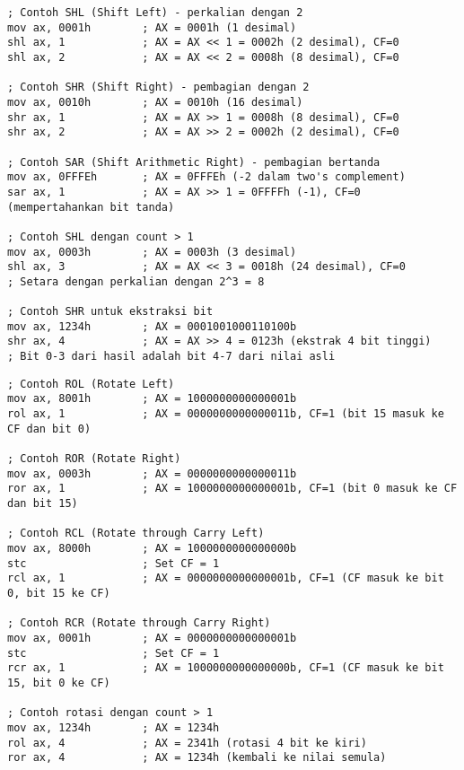 \documentclass[../main.tex]{subfiles}
\begin{document}
\begin{lstlisting}[language={[x86masm]Assembler}, caption=Instruksi SHIFT, label={lst:shift-examples}]
; Contoh SHL (Shift Left) - perkalian dengan 2
mov ax, 0001h        ; AX = 0001h (1 desimal)
shl ax, 1            ; AX = AX << 1 = 0002h (2 desimal), CF=0
shl ax, 2            ; AX = AX << 2 = 0008h (8 desimal), CF=0

; Contoh SHR (Shift Right) - pembagian dengan 2
mov ax, 0010h        ; AX = 0010h (16 desimal)
shr ax, 1            ; AX = AX >> 1 = 0008h (8 desimal), CF=0
shr ax, 2            ; AX = AX >> 2 = 0002h (2 desimal), CF=0

; Contoh SAR (Shift Arithmetic Right) - pembagian bertanda
mov ax, 0FFFEh       ; AX = 0FFFEh (-2 dalam two's complement)
sar ax, 1            ; AX = AX >> 1 = 0FFFFh (-1), CF=0 (mempertahankan bit tanda)

; Contoh SHL dengan count > 1
mov ax, 0003h        ; AX = 0003h (3 desimal)
shl ax, 3            ; AX = AX << 3 = 0018h (24 desimal), CF=0
; Setara dengan perkalian dengan 2^3 = 8

; Contoh SHR untuk ekstraksi bit
mov ax, 1234h        ; AX = 0001001000110100b
shr ax, 4            ; AX = AX >> 4 = 0123h (ekstrak 4 bit tinggi)
; Bit 0-3 dari hasil adalah bit 4-7 dari nilai asli
\end{lstlisting}

\begin{lstlisting}[language={[x86masm]Assembler}, caption=Instruksi ROTATE, label={lst:rotate-examples}]
; Contoh ROL (Rotate Left)
mov ax, 8001h        ; AX = 1000000000000001b
rol ax, 1            ; AX = 0000000000000011b, CF=1 (bit 15 masuk ke CF dan bit 0)

; Contoh ROR (Rotate Right)
mov ax, 0003h        ; AX = 0000000000000011b
ror ax, 1            ; AX = 1000000000000001b, CF=1 (bit 0 masuk ke CF dan bit 15)

; Contoh RCL (Rotate through Carry Left)
mov ax, 8000h        ; AX = 1000000000000000b
stc                  ; Set CF = 1
rcl ax, 1            ; AX = 0000000000000001b, CF=1 (CF masuk ke bit 0, bit 15 ke CF)

; Contoh RCR (Rotate through Carry Right)
mov ax, 0001h        ; AX = 0000000000000001b
stc                  ; Set CF = 1
rcr ax, 1            ; AX = 1000000000000000b, CF=1 (CF masuk ke bit 15, bit 0 ke CF)

; Contoh rotasi dengan count > 1
mov ax, 1234h        ; AX = 1234h
rol ax, 4            ; AX = 2341h (rotasi 4 bit ke kiri)
ror ax, 4            ; AX = 1234h (kembali ke nilai semula)
\end{lstlisting}
\end{document}
